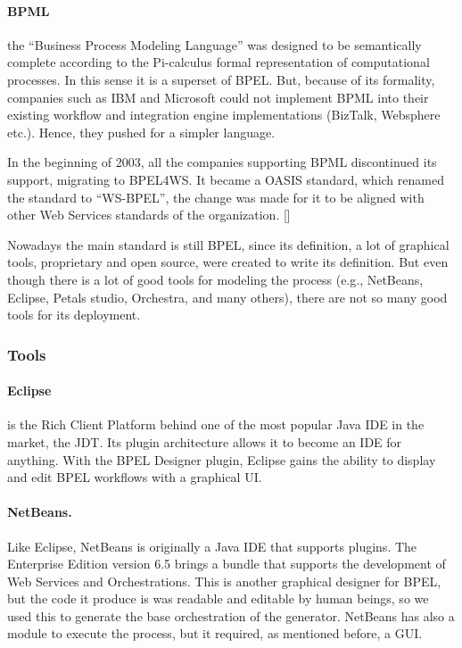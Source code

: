 \paragraph{BPML} 
the ``Business Process Modeling Language'' was designed to be semantically complete according to the Pi-calculus formal representation of computational processes. In this sense it is a superset of BPEL. But, because of its formality, companies such as IBM and Microsoft could not implement BPML into their existing workflow and integration engine implementations (BizTalk, Websphere etc.). Hence, they pushed for a simpler language.

In the beginning of 2003, all the companies supporting BPML discontinued its support, migrating to BPEL4WS. It became a OASIS standard, which renamed the standard to ``WS-BPEL'', the change was made for it to be aligned with other Web Services standards of the organization. [\citet{OASIS}]

Nowadays the main standard is still BPEL, since its definition, a lot of graphical tools, proprietary and open source, were created to write its definition. But even though there is a lot of good tools for modeling the process (e.g., NetBeans, Eclipse, Petals studio, Orchestra, and many others), there are not so many good tools for its deployment.

\subsubsection{Tools}

\paragraph{Eclipse}
is the Rich Client Platform behind one of the most popular Java IDE in the market, the JDT. Its plugin architecture allows it to become an IDE for anything. With the BPEL Designer plugin, Eclipse gains the ability to display and edit BPEL workflows with a graphical UI.

\paragraph{NetBeans.}
Like Eclipse, NetBeans is originally a Java IDE that supports plugins. The Enterprise Edition version 6.5 brings a bundle that supports the development of Web Services and Orchestrations. This is another graphical designer for BPEL, but the code it produce is was readable and editable by human beings, so we used this to generate the base orchestration of the generator. NetBeans has also a module to execute the process, but it required, as mentioned before, a GUI.

